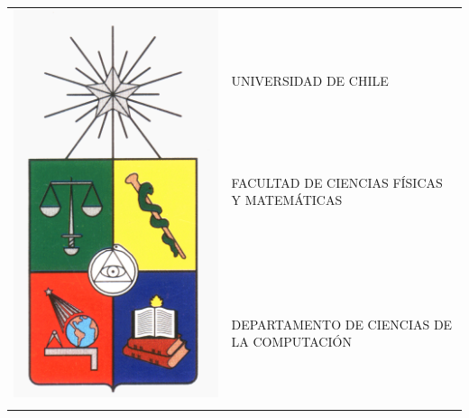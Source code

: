 \documentclass[11pt,oneside,letterpaper,leqno]{report}
\newcommand{\dpto}{DEPARTAMENTO DE CIENCIAS DE LA COMPUTACIÓN}
\newcommand{\Dpto}{\MakeUppercase{\dpto}}
\begin{document}
\makeatletter
\def\@roman#1{\romannumeral #1}
\makeatother

\setcounter{page}{1}
\thispagestyle{empty}
\begin{center}

\begin{tabular}{rl}
\multirow{5}{*}{\includegraphics[scale=0.1]{Figuras/escudoU.png}} &\\
& \\
& UNIVERSIDAD DE CHILE\\
& FACULTAD DE CIENCIAS FÍSICAS Y MATEMÁTICAS\\
& \Dpto\\
& \\
\end{tabular}


\end{center}
\end{document}
